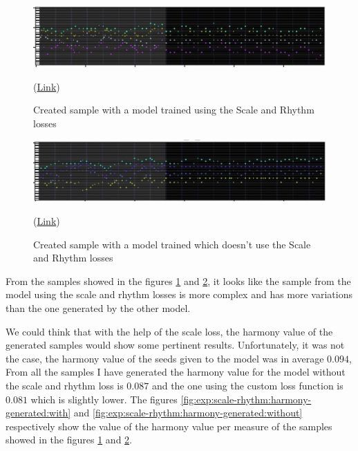 \documentclass[12pt]{report}
\begin{document}
\begin{figure}[htbp]
    \centering
    \includegraphics[width=\textwidth]{images/experiences/scale-rhythm-rnn/generated-with-scale-rhythm.jpg}
    \caption{Created sample with a model trained using the Scale and Rhythm losses}
    (\href{https://github.com/ValentinVignal/midiGenerator/blob/master/samples/scale-rhythm-comparison/generated-with-scale-rhythm.mid}{Link})
    \label{fig:exp:scale-rhythm:with}
\end{figure}
\begin{figure}[htbp]
    \centering
    \includegraphics[width=\textwidth]{images/experiences/scale-rhythm-rnn/generated-without-scale-rhythm.jpg}
    \caption{Created sample with a model trained which doesn't use the Scale and Rhythm losses}
    (\href{https://github.com/ValentinVignal/midiGenerator/blob/master/samples/scale-rhythm-comparison/generated-without-scale-rhythm.mid}{Link})
    \label{fig:exp:scale-rhythm:without}
\end{figure}

From the samples showed in the figures \ref{fig:exp:scale-rhythm:with} and \ref{fig:exp:scale-rhythm:without}, it looks like the sample from the model using the scale and rhythm losses is more complex and has more variations than the one generated by the other model.

We could think that with the help of the scale loss, the harmony value of the generated samples would show some pertinent results.
Unfortunately, it was not the case, the harmony value of the seeds given to the model was in average $0.094$,
From all the samples I have generated the harmony value for the model without the scale and rhythm loss is $0.087$ and the one using the custom loss function is $0.081$ which is slightly lower.
The figures \ref{fig:exp:scale-rhythm:harmony-generated:with} and \ref{fig:exp:scale-rhythm:harmony-generated:without} respectively show the value of the harmony value per measure of the samples showed in the figures \ref{fig:exp:scale-rhythm:with} and \ref{fig:exp:scale-rhythm:without}.
\end{document}

